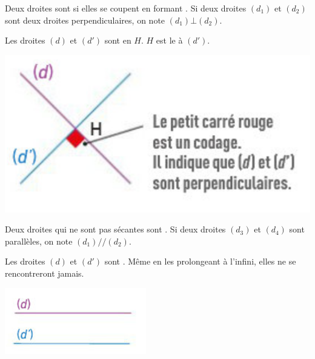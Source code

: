 \documentclass[xcolor={dvipsnames}]{beamer}
\begin{document}
\begin{frame}
	\begin{mydef}
		Deux droites sont  si elles se coupent en formant . Si deux droites $(d_1)$ et $(d_2)$ sont deux droites perpendiculaires, on note $(d_1) \bot (d_2)$.
	\end{mydef}
	
	\begin{myex}
			Les droites $(d)$ et $(d')$ sont \hspace*{4cm} en $H$. $H$ est le \hspace*{8cm} à $(d')$.
			
			\begin{center}
				\includegraphics[scale=0.6]{../img/perp}
			\end{center}
		
	\end{myex}
\end{frame}

\begin{frame}
	\begin{mydef}
		Deux droites qui ne sont pas sécantes sont . Si deux droites $(d_3)$ et $(d_4)$ sont parallèles, on note $(d_1) // (d_2)$.
	\end{mydef}
	
	\begin{myex}
		
			Les droites $(d)$ et $(d')$ sont \hspace*{5cm}. Même en les prolongeant à l'infini, elles ne se rencontreront jamais.
			
			\begin{center}
				\includegraphics[scale=0.8]{../img/para1}
			\end{center}
		
		
	\end{myex}
\end{frame}
\end{document}
